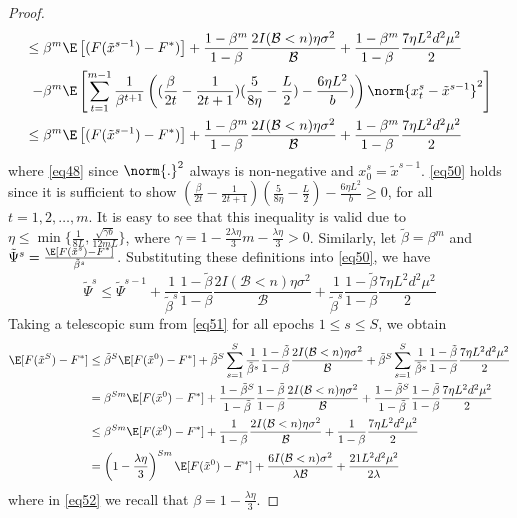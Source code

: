 \begin{proof}
\begin{align}
\leq\beta^m\E&\left[(F(\tilde{x}^{s-1}) - F^*)\right] + \frac{1-\beta^m}{1-\beta}\frac{2I(\mathcal{B} < n)\eta \sigma ^2}{\mathcal{B}}+\frac{1-\beta^m}{1-\beta}\frac{7 \eta L^2 d^2 \mu^2}{2}\notag
\\-\beta^m\E&\left[\sum_{t=1}^{m-1}\frac{1}{\beta^{t+1}}\left((\frac{\beta}{2t} - \frac{1}{2t+1})(\frac{5}{8\eta} - \frac{L}{2})-\frac{6 \eta L^2}{b})\right) \norm{x_{t}^s-\tilde{x}^{s-1}}^2 \right]\notag\\
\leq\beta^m\E&\left[(F(\tilde{x}^{s-1}) - F^*)\right] + \frac{1-\beta^m}{1-\beta}\frac{2I(\mathcal{B} < n)\eta \sigma ^2}{\mathcal{B}}+\frac{1-\beta^m}{1-\beta}\frac{7 \eta L^2 d^2 \mu^2}{2}\label{eq50}
\end{align}
where \eqref{eq48} since $\norm{.}^2$ always is non-negative and $x_0^s=\tilde{x}^{s-1}$. \eqref{eq50} holds since it is sufficient to show $(\frac{\beta}{2t} - \frac{1}{2t+1})(\frac{5}{8\eta} - \frac{L}{2})- \frac{6\eta L^2}{b} \geq 0$, for all $t=1, 2,\ldots, m$. 
It is easy to see that this inequality is valid due to $\eta \leq \min\{\frac{1}{8L}, \frac{\sqrt{\gamma b}}{12 m L }\}$, where $\gamma = 1-\frac{2\lambda\eta}{3} m-\frac{\lambda\eta}{3} > 0$. Similarly, let  $\tilde{\beta} = \beta^m$ and $\tilde{\Psi}^s = \frac{\E[F(\tilde{x}^{s})-F^*]}{\tilde{\beta}^s}$. Substituting these definitions into \eqref{eq50}, we have
\begin{equation}\label{eq51}
\tilde{\Psi}^s \leq \tilde{\Psi}^{s-1} + \frac{1}{\tilde{\beta}^s} \frac{1-\tilde{\beta}}{1-{\beta}}\frac{2 I(\mathcal{B} < n)\eta \sigma ^2}{\mathcal{B}}+ \frac{1}{\tilde{\beta}^s} \frac{1-\tilde{\beta}}{1-{\beta}}\frac{7\eta L^2 d^2 \mu^2}{2}
\end{equation}
Taking a telescopic sum from \eqref{eq51} for all epochs $1 \leq s \leq S$, we obtain
\begin{align}
\E[F(\tilde{x}^S) - {F}^*] & \leq \tilde{\beta}^{S} \E[F(\tilde{x}^0) - {F}^*] + \tilde{\beta}^{S} \sum_{s=1}^S \frac{1}{\tilde{\beta}^s}\frac{1-\tilde{\beta}}{1-{\beta}}\frac{2I(\mathcal{B} < n)\eta \sigma ^2}{\mathcal{B}} + \tilde{\beta}^{S} \sum_{s=1}^S \frac{1}{\tilde{\beta}^s}\frac{1-\tilde{\beta}}{1-{\beta}}\frac{7 \eta L^2 d^2 \mu^2}{2}\notag\\
& = {\beta}^{Sm} \E[F(\tilde{x}^0) - {F}^*] + \frac{1-\tilde{\beta}^S}{1-\tilde{\beta}}\frac{1-\tilde{\beta}}{1-{\beta}}\frac{2I(\mathcal{B} < n)\eta \sigma ^2}{\mathcal{B}}+ \frac{1-\tilde{\beta}^S}{1-\tilde{\beta}}\frac{1-\tilde{\beta}}{1-{\beta}}\frac{7 \eta L^2 d^2 \mu^2}{2}\notag\\
& \leq {\beta}^{Sm} \E[F(\tilde{x}^0) - {F}^*] + \frac{1}{1-{\beta}}\frac{2 I(\mathcal{B} < n)\eta \sigma ^2}{\mathcal{B}}+ \frac{1}{1-{\beta}}\frac{7 \eta L^2 d^2 \mu^2}{2}\notag\\
& = \left(1-\frac{\lambda\eta}{3}\right)^{Sm} \E[F(\tilde{x}^0) - {F}^*] + \frac{6I(\mathcal{B} < n) \sigma ^2}{\lambda\mathcal{B}}+\frac{21 L^2 d^2 \mu^2}{2\lambda}\label{eq52}
\end{align}
where in \eqref{eq52} we recall that $\beta = 1-\frac{\lambda\eta}{3}$.
\end{proof}
